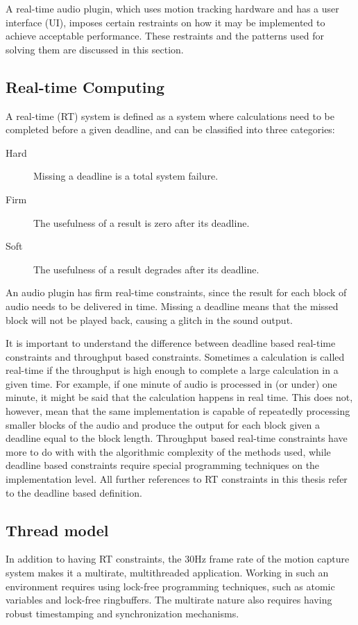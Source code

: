 A real-time audio plugin,
which uses motion tracking hardware
and has a user interface (UI),
imposes certain restraints on how it may be implemented
to achieve acceptable performance.
These restraints and the patterns used for solving them
are discussed in this section.

\subsection{Real-time Computing}

A real-time (RT) system is defined as a system where calculations
need to be completed before a given deadline,
and can be classified into three categories:
\begin{description}
\item[Hard]
Missing a deadline is a total system failure.
\item[Firm]
The usefulness of a result is zero after its deadline.
\item[Soft]
The usefulness of a result degrades after its deadline.
\end{description}
An audio plugin has firm real-time constraints,
since the result for each block of audio needs to be delivered in time.
Missing a deadline means that the missed block will not be played back,
causing a glitch in the sound output.

It is important to understand the difference between
deadline based real-time constraints
and throughput based constraints.
Sometimes a calculation is called real-time
if the throughput is high enough to complete
a large calculation in a given time.
For example, if one minute of audio is
processed in (or under) one minute,
it might be said that the calculation happens in real time.
This does not, however, mean that the same
implementation is capable of repeatedly processing smaller
blocks of the audio and produce the output for each block
given a deadline equal to the block length.
Throughput based real-time constraints have
more to do with with the algorithmic complexity
of the methods used,
while deadline based constraints
require special programming techniques on the implementation level.
All further references to RT constraints in this thesis
refer to the deadline based definition.

\subsection{Thread model}

In addition to having RT constraints,
the 30Hz frame rate of the motion capture system
makes it a multirate, multithreaded application.
Working in such an environment requires using
lock-free programming techniques,
such as atomic variables and lock-free ringbuffers.
The multirate nature also requires having robust timestamping and synchronization mechanisms.

